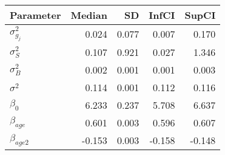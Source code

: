 \begin{table}[ht]
\centering
\begin{tabular}{lrrrr}
  \hline
Parameter & Median & SD & InfCI & SupCI \\ 
  \hline
$\sigma^{2}_{g_{j}}$ & 0.024 & 0.077 & 0.007 & 0.170 \\ 
  $\sigma^{2}_{S}$ & 0.107 & 0.921 & 0.027 & 1.346 \\ 
  $\sigma^{2}_{B}$ & 0.002 & 0.001 & 0.001 & 0.003 \\ 
  $\sigma^{2}$ & 0.114 & 0.001 & 0.112 & 0.116 \\ 
  $\beta_{0}$ & 6.233 & 0.237 & 5.708 & 6.637 \\ 
  $\beta_{age}$ & 0.601 & 0.003 & 0.596 & 0.607 \\ 
  $\beta_{age2}$ & -0.153 & 0.003 & -0.158 & -0.148 \\ 
   \hline
\end{tabular}
\end{table}
